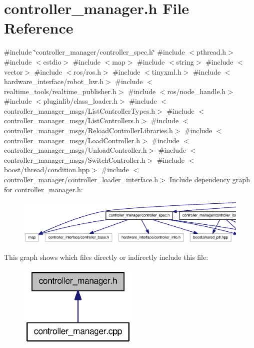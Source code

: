 \section{controller\-\_\-manager.\-h \-File \-Reference}
\label{controller__manager_8h}
{\ttfamily \#include \char`\"{}controller\-\_\-manager/controller\-\_\-spec.\-h\char`\"{}}\*
{\ttfamily \#include $<$pthread.\-h$>$}\*
{\ttfamily \#include $<$cstdio$>$}\*
{\ttfamily \#include $<$map$>$}\*
{\ttfamily \#include $<$string$>$}\*
{\ttfamily \#include $<$vector$>$}\*
{\ttfamily \#include $<$ros/ros.\-h$>$}\*
{\ttfamily \#include $<$tinyxml.\-h$>$}\*
{\ttfamily \#include $<$hardware\-\_\-interface/robot\-\_\-hw.\-h$>$}\*
{\ttfamily \#include $<$realtime\-\_\-tools/realtime\-\_\-publisher.\-h$>$}\*
{\ttfamily \#include $<$ros/node\-\_\-handle.\-h$>$}\*
{\ttfamily \#include $<$pluginlib/class\-\_\-loader.\-h$>$}\*
{\ttfamily \#include $<$controller\-\_\-manager\-\_\-msgs/\-List\-Controller\-Types.\-h$>$}\*
{\ttfamily \#include $<$controller\-\_\-manager\-\_\-msgs/\-List\-Controllers.\-h$>$}\*
{\ttfamily \#include $<$controller\-\_\-manager\-\_\-msgs/\-Reload\-Controller\-Libraries.\-h$>$}\*
{\ttfamily \#include $<$controller\-\_\-manager\-\_\-msgs/\-Load\-Controller.\-h$>$}\*
{\ttfamily \#include $<$controller\-\_\-manager\-\_\-msgs/\-Unload\-Controller.\-h$>$}\*
{\ttfamily \#include $<$controller\-\_\-manager\-\_\-msgs/\-Switch\-Controller.\-h$>$}\*
{\ttfamily \#include $<$boost/thread/condition.\-hpp$>$}\*
{\ttfamily \#include $<$controller\-\_\-manager/controller\-\_\-loader\-\_\-interface.\-h$>$}\*
\-Include dependency graph for controller\-\_\-manager.\-h\-:\nopagebreak
\begin{figure}[H]
\begin{center}
\leavevmode
\includegraphics[width=350pt]{controller__manager_8h__incl}
\end{center}
\end{figure}
\-This graph shows which files directly or indirectly include this file\-:\nopagebreak
\begin{figure}[H]
\begin{center}
\leavevmode
\includegraphics[width=162pt]{controller__manager_8h__dep__incl}
\end{center}
\end{figure}
